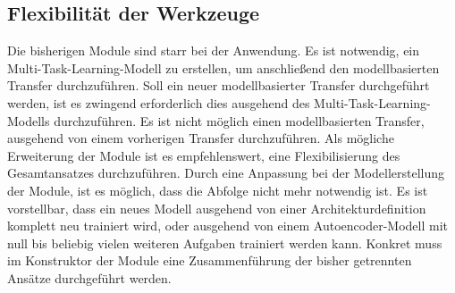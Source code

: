 	\subsection{Flexibilität der Werkzeuge}
	\label{subsec:FlexibilitätDerWerkzeuge}
	Die bisherigen Module sind starr bei der Anwendung. Es ist notwendig, ein Multi-Task-Learning-Modell zu erstellen, um anschließend den modellbasierten Transfer durchzuführen. Soll ein neuer modellbasierter Transfer durchgeführt werden, ist es zwingend erforderlich dies ausgehend des Multi-Task-Learning-Modells durchzuführen. Es ist nicht möglich einen modellbasierten Transfer, ausgehend von einem vorherigen Transfer durchzuführen. 
	Als mögliche Erweiterung der Module ist es empfehlenswert, eine Flexibilisierung des Gesamtansatzes durchzuführen. Durch eine Anpassung bei der Modellerstellung der Module, ist es möglich, dass die Abfolge nicht mehr notwendig ist. Es ist vorstellbar, dass ein neues Modell ausgehend von einer Architekturdefinition komplett neu trainiert wird, oder ausgehend von einem Autoencoder-Modell mit null bis beliebig vielen weiteren Aufgaben trainiert werden kann. Konkret muss im Konstruktor der Module eine Zusammenführung der bisher getrennten Ansätze durchgeführt werden.     


	   